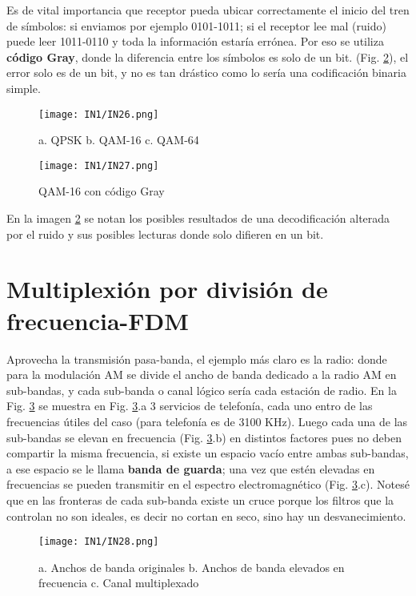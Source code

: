\documentclass[
	12pt, %
	fleqn, %
	a4paper, %
]{LegrandOrangeBook}
\begin{document}
Es de vital importancia que receptor pueda ubicar correctamente el inicio del tren de símbolos: si enviamos por ejemplo 0101-1011; si el receptor lee mal (ruido) puede leer 1011-0110 y toda la información estaría errónea. Por eso se utiliza \textbf{código Gray}, donde la diferencia entre los símbolos es solo de un bit. (Fig. \ref{fig: qam gray}), el error solo es de un bit, y no es tan drástico como lo sería una codificación binaria simple.
\begin{figure}[]
\centering
\texttt{[image: IN1/IN26.png]}
\caption{a. QPSK b. QAM-16 c. QAM-64}
\label{fig: diagrama de constelación}
\end{figure}
\begin{figure}[]
\centering
\texttt{[image: IN1/IN27.png]}
\caption{QAM-16 con código Gray}
\label{fig: qam gray}
\end{figure}
En la imagen \ref{fig: qam gray} se notan los posibles resultados de una decodificación alterada por el ruido y sus posibles lecturas donde solo difieren en un bit.
\section{Multiplexión por división de frecuencia-FDM}
Aprovecha la transmisión pasa-banda, el ejemplo más claro es la radio: donde para la modulación AM se divide el ancho de banda dedicado a la radio AM en sub-bandas, y cada sub-banda o canal lógico sería cada estación de radio. En la Fig. \ref{fig: fdm mul} se muestra en Fig. \ref{fig: fdm mul}.a 3 servicios de telefonía, cada uno entro de las frecuencias útiles del caso (para telefonía es de 3100 KHz). Luego cada una de las sub-bandas se elevan en frecuencia (Fig. \ref{fig: fdm mul}.b) en distintos factores pues no deben compartir la misma frecuencia, si existe un espacio vacío entre ambas sub-bandas, a ese espacio se le llama \textbf{banda de guarda}; una vez que estén elevadas en frecuencias se pueden transmitir en el espectro electromagnético (Fig. \ref{fig: fdm mul}.c). Notesé que en las fronteras de cada sub-banda existe un cruce porque los filtros que la controlan no son ideales, es decir no cortan en seco, sino hay un desvanecimiento.
\begin{figure}[]
\centering
\texttt{[image: IN1/IN28.png]}
\caption{a. Anchos de banda originales b. Anchos de banda elevados en frecuencia c. Canal multiplexado}
\label{fig: fdm mul}
\end{figure}
\end{document}
